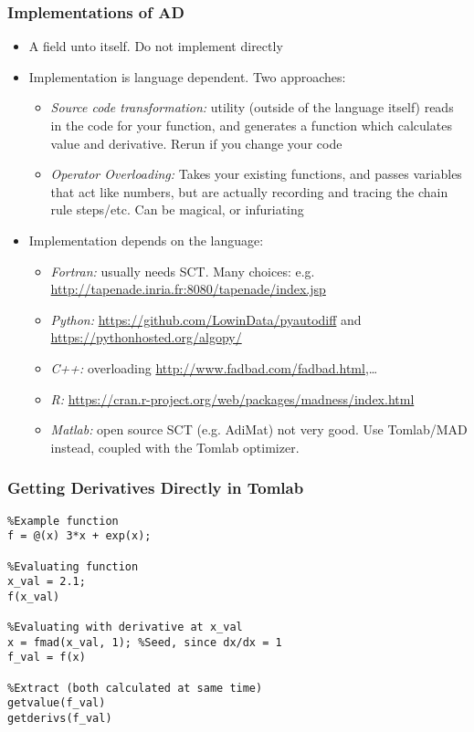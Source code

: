 \documentclass[nofootline]{etk-presentation}
\begin{document}
\begin{frame}[fragile]	\frametitle{Implementations of AD}
	\begin{itemize}
		\item A field unto itself.  Do not implement directly
		\item Implementation is language dependent.  Two approaches:
		\begin{itemize}
			\item \textit{Source code transformation:} utility (outside of the language itself) reads in the code for your function, and generates a function which calculates value and derivative.  Rerun if you change your code
			\item \textit{Operator Overloading:} Takes your existing functions, and passes variables that act like numbers, but are actually recording and tracing the chain rule steps/etc.  Can be magical, or infuriating
		\end{itemize}
		\item Implementation depends on the language:
		\begin{itemize}
			\item \textit{Fortran:} usually needs SCT.  Many choices: e.g. \url{http://tapenade.inria.fr:8080/tapenade/index.jsp}
			\item \textit{Python:} \url{https://github.com/LowinData/pyautodiff} and \url{https://pythonhosted.org/algopy/}
			\item \textit{C++:} overloading \url{http://www.fadbad.com/fadbad.html},\ldots
			\item \textit{R:} \url{https://cran.r-project.org/web/packages/madness/index.html}
			\item \textit{Matlab:} open source SCT (e.g. AdiMat) not very good.  Use Tomlab/MAD instead, coupled with the Tomlab optimizer.
		\end{itemize}
	\end{itemize}
\end{frame}	

\begin{frame}[fragile]	\frametitle{Getting Derivatives Directly in Tomlab}
	\begin{verbatim}
%Example function
f = @(x) 3*x + exp(x);

%Evaluating function
x_val = 2.1;
f(x_val)

%Evaluating with derivative at x_val
x = fmad(x_val, 1); %Seed, since dx/dx = 1
f_val = f(x)

%Extract (both calculated at same time)
getvalue(f_val)
getderivs(f_val)
	\end{verbatim}
 \end{frame}
\end{document}

